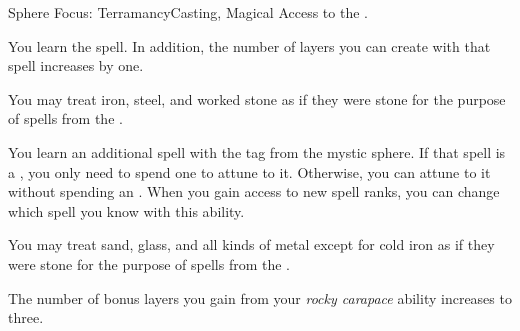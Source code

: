     \begin{feat}{Sphere Focus: Terramancy}{Casting, Magical}
        \featpre Access to the  .

         You learn the  spell.
        In addition, the number of layers you can create with that spell increases by one.

         You may treat iron, steel, and worked stone as if they were stone for the purpose of spells from the  .

         You learn an additional spell with the  tag from the  mystic sphere.
        If that spell is a , you only need to spend one  to attune to it.
        Otherwise, you can attune to it without spending an .
        When you gain access to new spell ranks, you can change which spell you know with this ability.

         You may treat sand, glass, and all kinds of metal except for cold iron as if they were stone for the purpose of spells from the  .

         The number of bonus layers you gain from your \textit{rocky carapace} ability increases to three.
    \end{feat}

